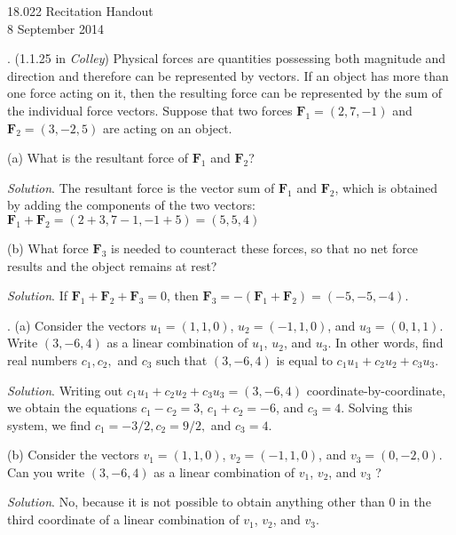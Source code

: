 \documentclass[11pt]{article}
\theoremstyle{definition}
\newcounter{prob}
\newcommand\itm{\theprob.  \stepcounter{prob}}
\newcommand\sol[2]{\textit{Solution}. #1}
\newcommand\sol[2]{#2}
\begin{document}
\thispagestyle{empty}

\begin{center}
  18.022 Recitation Handout \iftoggle{solutions}{(with solutions)}{} \\
  8 September 2014 \\
\end{center}

\itm (1.1.25 in \textit{Colley}) Physical forces are quantities possessing both magnitude and direction and therefore can be represented by vectors. If an object has more than one force acting on it, then the resulting force can be represented by the sum of the individual force vectors. Suppose that two forces $\mathbf{F}_1=(2,7,-1)$ and $\mathbf{F}_2 = (3,-2,5)$ are acting on an object. 

(a) What is the resultant force of $\mathbf{F}_1$ and $\mathbf{F}_2$? 

\sol{The resultant force is the vector sum of $\mathbf{F}_1$ and $\mathbf{F}_2$, which is obtained by adding the components of the two vectors: $\mathbf{F}_1+\mathbf{F}_2=(2+3,7-1,-1+5)=\boxed{(5,5,4)}$}{}

(b) What force $\mathbf{F}_3$ is needed to counteract these forces, so that no net force results and the object remains at rest? 

\sol{If $\mathbf{F}_1+\mathbf{F}_2+\mathbf{F}_3=0$, then $\mathbf{F}_3=-(\mathbf{F}_1+\mathbf{F}_2)=\boxed{(-5,-5,-4)}$. }{\vspace{1cm}}

\itm (a) Consider the vectors $u_1=(1,1,0)$, $u_2=(-1,1,0)$, and $u_3=(0,1,1)$. Write $(3,-6,4)$ as a linear combination of $u_1$, $u_2$, and $u_3$. In other words, find real numbers $c_1, c_2,$ and $c_3$ such that $(3,-6,4)$ is equal to $c_1u_1+c_2u_2+c_3u_3$. 

\sol{Writing out $c_1u_1+c_2u_2+c_3u_3=(3,-6,4)$ coordinate-by-coordinate, we obtain the equations $c_1-c_2=3$, $c_1+c_2=-6$, and $c_3=4$. Solving this system, we find $c_1 = -3/2, c_2= 9/2,$ and $c_3=4$. }{\vspace{2cm}}

(b) Consider the vectors $v_1=(1,1,0)$, $v_2=(-1,1,0)$, and $v_3=(0,-2,0)$. Can you write $(3,-6,4)$ as a linear combination of $v_1$, $v_2$, and $v_3$ ? 

\sol{No, because it is not possible to obtain anything other than 0 in the third coordinate of a linear combination of $v_1$, $v_2$, and $v_3$.}{\vspace{2cm}}
\end{document}
